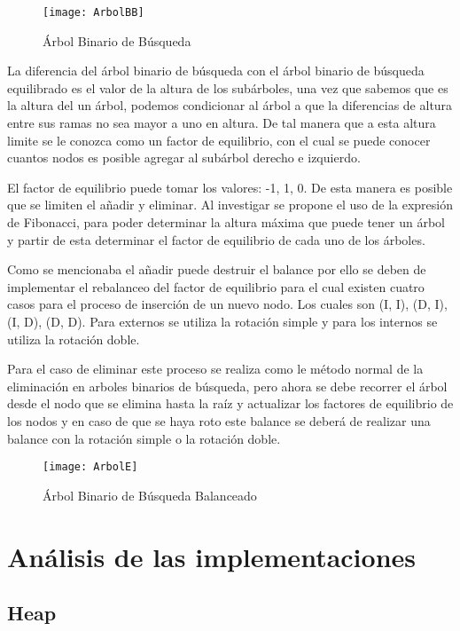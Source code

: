 \documentclass[12pt,a4paper]{article}
\begin{document}
		\begin{figure}[h]
			\centering
			\texttt{[image: ArbolBB]}
			\caption{Árbol Binario de Búsqueda}
		\end{figure}

	La diferencia del árbol binario de búsqueda con el árbol binario de búsqueda equilibrado es  el valor de la altura de los subárboles, una vez que sabemos que es la altura del un árbol, podemos condicionar al árbol a que la diferencias de altura entre sus ramas no sea mayor a uno en altura. De tal manera que a esta altura limite se le conozca como un factor de equilibrio, con el cual se puede conocer cuantos nodos es posible agregar al subárbol derecho e izquierdo. 
	
	El factor de equilibrio puede tomar los valores: -1, 1, 0. De esta manera es posible que se limiten el añadir y eliminar. Al investigar se propone el uso de la expresión de Fibonacci, para poder determinar la altura máxima que puede tener un árbol y partir de esta determinar el factor de equilibrio de cada uno de los árboles.
	
	Como se mencionaba el añadir puede destruir el balance por ello se deben de implementar el rebalanceo del factor de equilibrio para el cual existen  cuatro casos para el proceso de inserción de un nuevo nodo. Los cuales son (I, I), (D, I), (I, D), (D, D). Para externos se utiliza la rotación simple y para los internos se utiliza la rotación doble.

	Para el caso de eliminar este proceso se realiza como le  método normal de la eliminación en arboles binarios de búsqueda, pero ahora se debe recorrer el árbol desde el nodo que se elimina hasta la raíz y actualizar los factores de equilibrio de los nodos y en caso de que se haya roto este balance se deberá de realizar una balance con la rotación simple o la rotación doble. 

		\begin{figure}[h]
			\centering
			\texttt{[image: ArbolE]}
			\caption{Árbol Binario de Búsqueda Balanceado}
		\end{figure}


	\section{Análisis de las implementaciones}
		\subsection{Heap}
\end{document}

